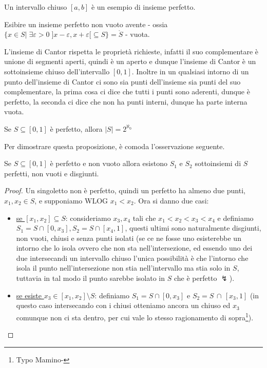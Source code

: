 \begin{example}
	Un intervallo chiuso $[a,b]$ è un esempio di insieme perfetto.
\end{example}

\begin{exercise}
	Esibire un insieme perfetto non vuoto avente  - ossia $\{x \in S | \; \exists \varepsilon > 0 \; ]x -\varepsilon,x+\varepsilon[ \subseteq S\} = \mathring{S}$ - vuota.
\end{exercise}

\begin{soln}
	L'insieme di Cantor rispetta le proprietà richieste, infatti il suo complementare è unione di segmenti aperti, quindi è un aperto e dunque l'insieme di Cantor è un sottoinsieme chiuso dell'intervallo $[0,1]$.
	Inoltre in un qualsiasi intorno di un punto dell'insieme di Cantor ci sono sia punti dell'insieme sia punti del suo complementare, la prima cosa ci dice che tutti i punti sono aderenti, dunque è perfetto, la seconda ci dice che non ha punti interni,
	dunque ha parte interna vuota.
\end{soln}

\begin{proposition}
	Se $S \subseteq [0,1]$ è perfetto, allora $|S| = 2^{\aleph_0}$
\end{proposition}

Per dimostrare questa proposizione, è comoda l'osservazione seguente.

\begin{remark}
	Se $S \subseteq [0,1]$ è perfetto e non vuoto allora esistono $S_1$ e $S_2$ sottoinsiemi di $S$ perfetti, non vuoti e disgiunti.
\end{remark}

\begin{proof}
	Un singoletto non è perfetto, quindi un perfetto ha almeno due punti, $x_1,x_2 \in S$, e supponiamo WLOG $x_1 < x_2$. Ora si danno due casi:
	\begin{itemize}
		\item \underline{se $[x_1,x_2] \subseteq S$}: consideriamo $x_3,x_4$ tali che $x_1 < x_2 < x_3 < x_4$ e definiamo $S_1 = S \cap [0,x_3], S_2 = S \cap [x_4,1]$, questi ultimi sono naturalmente disgiunti, non vuoti, chiusi e senza punti isolati
		(se ce ne fosse uno esisterebbe un intorno che lo isola ovvero che non sta nell'intersezione, ed essendo uno dei due intersecandi un intervallo chiuso l'unica possibilità è che l'intorno che isola il punto 
		nell'intersezione non stia nell'intervallo ma stia solo in $S$, tuttavia in tal modo il punto sarebbe isolato in $S$ che è perfetto $\lightning$).
		\item \underline{se esiste $x_3 \in [x_1,x_2]\setminus S$}: definiamo $S_1 = S \cap [0,x_3]$ e $S_2 = S \,\cap\, [x_3,1]$ (in questo caso intersecando con i chiusi otteniamo ancora un chiuso ed $x_3$ comunque non ci sta dentro, per cui vale lo stesso ragionamento di sopra\footnote{Typo Mamino-}).
	\end{itemize}
\end{proof}

